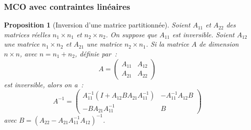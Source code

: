 \documentclass[10pt]{beamer}
\theoremstyle{plain}
\newtheorem{prop}{Proposition}
\begin{document}
\begin{frame}
  \frametitle{MCO avec contraintes linéaires}

  \begin{prop}[Inversion d'une matrice partitionnée]\label{prop:inversion}
    Soient $A_{11}$ et $A_{22}$ des matrices réelles $n_1\times n_1$ et $n_2\times n_2$. On suppose que $A_{11}$ est inversible. Soient $A_{12}$ une matrice $n_1\times n_2$ et $A_{21}$ une matrice $n_2\times n_1$. Si la matrice $A$ de dimension $n\times n$, avec $n = n_1+n_2$, définie par~:
    \[
      A =
      \begin{pmatrix}
        A_{11} & A_{12}\\
        A_{21} & A_{22}
      \end{pmatrix}
    \]
    est inversible, alors on a~:
    \[
      A^{-1} =
      \begin{pmatrix}
        A_{11}^{-1}\left( I + A_{12}BA_{21}A_{11}^{-1} \right) & -A_{11}^{-1}A_{12}B \\
        -BA_{21}A_{11}^{-1} & B
      \end{pmatrix}
    \]
    avec $B = \left(A_{22}-A_{21}A_{11}^{-1}A_{12}\right)^{-1}$.
  \end{prop}

\end{frame}
\end{document}
